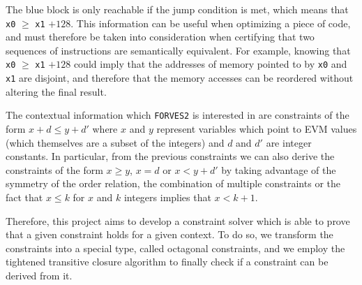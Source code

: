 \begin{center}
\end{center}

The blue block is only reachable if the jump condition is met, which means that \verb|x0| $\ge$ 
\verb|x1| $+ 128$. This information can be useful when optimizing a piece of code, and must therefore
be taken into consideration when certifying that two sequences of instructions are semantically 
equivalent. For example, knowing that \verb|x0| $\ge$ \verb|x1| $+ 128$ could imply that the addresses
of memory pointed to by \verb|x0| and \verb|x1| are disjoint, and therefore that the memory accesses
can be reordered without altering the final result.

The contextual information which \verb|FORVES2| is interested in are constraints of the form 
$x + d \le y + d'$ where $x$ and $y$ represent variables which point to EVM values (which themselves
are a subset of the integers) and $d$ and $d'$ are integer constants. In particular, from the previous
constraints we can also derive the constraints of the form $x \ge y$, $x = d$ or $x < y + d'$ by taking
advantage of the symmetry of the order relation, the combination of multiple constraints or the fact
that $x \le k$ for $x$ and $k$ integers implies that $x < k + 1$. 

Therefore, this project aims to develop a constraint solver which is able to prove that a given
constraint holds for a given context. To do so, we transform the constraints into a special type,
called octagonal constraints, and we employ the tightened transitive closure algorithm to finally
check if a constraint can be derived from it.

